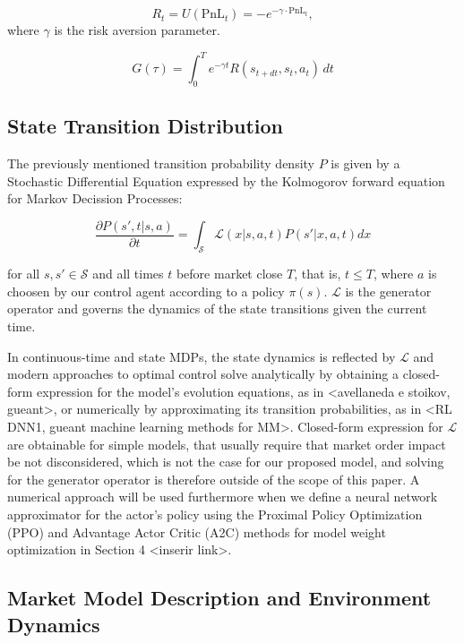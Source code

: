 \[
    R_t = U(\text{PnL}_t) = -e^{-\gamma \cdot \text{PnL}_t},
\]
where \( \gamma \) is the risk aversion parameter.


\begin{equation}
    \label{eq:equation}
    G(\tau) = \int_0^T e^{-\gamma t} R(s_{t+dt}, s_t, a_t) \, dt
\end{equation}

\subsection{State Transition Distribution}
\label{subsec:state-transition-distribution}

The previously mentioned transition probability density $P$ is given by a Stochastic Differential Equation expressed by the Kolmogorov forward equation for Markov Decission Processes:

\begin{equation}
    \label{eq:equation2}
    \frac{\partial P(s', t | s, a)}{\partial t}  = \int_{\mathcal{S}} \mathcal{L}(x | s, a, t) P(s'| x, a, t) dx
\end{equation}

for all $s, s' \in \mathcal{S}$ and all times $t$ before market close $T$, that is, $t \le T$, where $a$ is choosen by our control agent according to a policy $\pi (s)$. $\mathcal{L}$ is the generator operator and governs the dynamics of the state transitions given the current time.

In continuous-time and state MDPs, the state dynamics is reflected by $\mathcal{L}$ and modern approaches to optimal control solve analytically by obtaining a closed-form expression for the model's evolution equations, as in <avellaneda e stoikov, gueant>, or numerically by approximating its transition probabilities, as in <RL DNN1, gueant machine learning methods for MM>. Closed-form expression for $\mathcal{L}$ are obtainable for simple models, that usually require that market order impact be not disconsidered, which is not the case for our proposed model, and solving for the generator operator is therefore outside of the scope of this paper. A numerical approach will be used furthermore when we define a neural network approximator for the actor's policy using the Proximal Policy Optimization (PPO) and Advantage Actor Critic (A2C) methods for model weight optimization in Section 4 <inserir link>.

\subsection{Market Model Description and Environment Dynamics}
\label{subsec:market-model-description-and-environment-dynamics}


